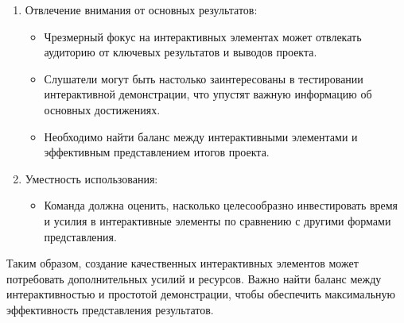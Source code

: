 \begin{enumerate}
\begin{itemize}
            \end{itemize}
        \item Отвлечение внимания от основных результатов:
            \begin{itemize}
                \item Чрезмерный фокус на интерактивных элементах может отвлекать аудиторию от ключевых результатов и выводов проекта.
                \item Слушатели могут быть настолько заинтересованы в тестировании интерактивной демонстрации, что упустят важную информацию об основных достижениях.
                \item Необходимо найти баланс между интерактивными элементами и эффективным представлением итогов проекта.
            \end{itemize}
        \item Уместность использования:
            \begin{itemize}
                \item Команда должна оценить, насколько целесообразно инвестировать время и усилия в интерактивные элементы по сравнению с другими формами представления.
            \end{itemize}
    \end{enumerate}

    Таким образом, создание качественных интерактивных элементов может потребовать дополнительных усилий и ресурсов. Важно найти баланс между интерактивностью и простотой демонстрации, чтобы обеспечить максимальную эффективность представления результатов.

